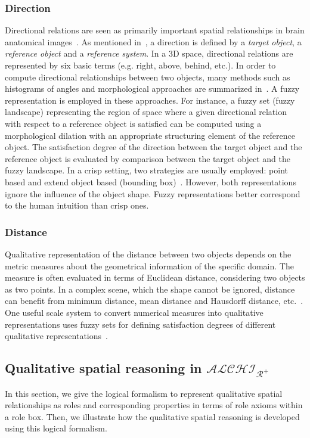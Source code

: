 \documentclass{article}
\begin{document}
\subsubsection{Direction}
Directional relations are seen as primarily important spatial relationships in brain anatomical images~\cite{Bloch2005fuzzy,fouquier2012sequential,Hudelot2008fuzzy,nempont2013constraint}.
As mentioned in~\cite{Bloch2005fuzzy}, a direction is defined by a \textit{target object}, a \textit{reference object} and a \textit{reference system}.
In a 3D space, directional relations are represented by six basic terms (e.g. right, above, behind, etc.).
In order to compute directional relationships between two objects, many methods such as histograms of angles and morphological approaches are summarized in~\cite{Bloch2005fuzzy}.
A fuzzy representation is employed in these approaches. 
For instance, a fuzzy set (fuzzy landscape) representing the region of space where a given directional relation with respect to a reference object is satisfied 
can be computed using a morphological dilation with an appropriate structuring element of the reference object.
The satisfaction degree of the direction between the target object and the reference object is evaluated by comparison between the target object and the fuzzy landscape.
In a crisp setting, two strategies are usually employed: point based and extend object based (bounding box)~\cite{chen2013survey}.
However, both representations ignore the influence of the object shape. 
Fuzzy representations better correspond to the human intuition than crisp ones.
\subsubsection{Distance}
Qualitative representation of the distance between two objects depends on the metric measures about the geometrical information of the specific domain.
The measure is often evaluated in terms of Euclidean distance, considering two objects as two points. In a complex scene, which the shape cannot be ignored,
distance can benefit from minimum distance, mean distance and Hausdorff distance, etc.~\cite{Bloch2005fuzzy}. One useful scale system to convert numerical measures into 
qualitative representations uses fuzzy sets for defining satisfaction degrees of different qualitative representations~\cite{Bloch2005fuzzy}.

\subsection{Qualitative spatial reasoning in $\mathcal{ALCHI_{R^+}}$}
In this section, we give the logical formalism to represent qualitative spatial relationships as roles and  corresponding properties in terms of role axioms within a role box.
Then, we illustrate how the qualitative spatial reasoning is developed using this logical formalism. 
\end{document}
